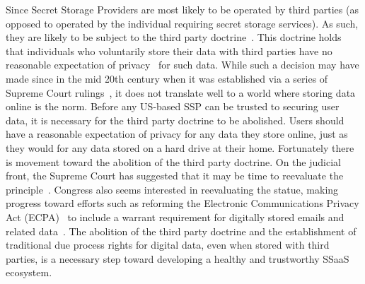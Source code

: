 Since Secret Storage Providers are most likely to be operated by third
parties (as opposed to operated by the individual requiring secret
storage services). As such, they are likely to be subject to the third
party doctrine~\cite{thompson-thirdparty}. This doctrine holds that
individuals who voluntarily store their data with third parties have
no reasonable expectation of privacy~\cite{scotus-katzvus} for such
data. While such a decision may have made since in the mid 20th
century when it was established via a series of Supreme Court
rulings~\cite{scotus-usvmiller-privacy, scotus-smithvmaryland}, it
does not translate well to a world where storing data online is the
norm. Before any US-based SSP can be trusted to securing user data, it
is necessary for the third party doctrine to be abolished. Users
should have a reasonable expectation of privacy for any data they
store online, just as they would for any data stored on a hard drive
at their home. Fortunately there is movement toward the abolition of
the third party doctrine. On the judicial front, the Supreme Court has
suggested that it may be time to reevaluate the
principle~\cite{scotus-usvjones}. Congress also seems interested in
reevaluating the statue, making progress toward efforts such as
reforming the Electronic Communications Privacy Act (ECPA)~\cite{ecpa}
to include a warrant requirement for digitally stored emails and
related data~\cite{eff-ecpareform}. The abolition of the third party
doctrine and the establishment of traditional due process rights for
digital data, even when stored with third parties, is a necessary step
toward developing a healthy and trustworthy SSaaS ecosystem.

